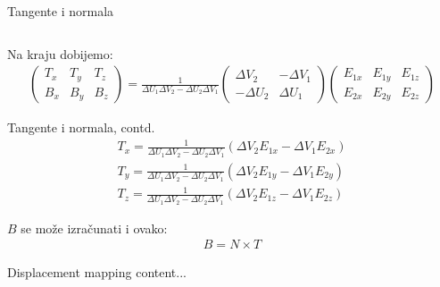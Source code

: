 \documentclass[9pt]{beamer}
\begin{document}
\begin{frame}{Tangente i normala}
\begin{columns}
\begin{column}{0.3\textwidth}
\begin{center}
			\end{center}
		\end{column}
	\end{columns}
	Na kraju dobijemo:
	\begin{align*}
	\begin{pmatrix}
	T_x & T_y &  T_z \\
	B_x & B_y &  B_z
	\end{pmatrix} = 
	\frac{1}{\Delta U_1\Delta V_2 - \Delta U_2\Delta V_1}
	\begin{pmatrix}
	\Delta V_2 & -\Delta V_1 \\
	-\Delta U_2 & \Delta U_1
	\end{pmatrix} 
	\begin{pmatrix}
	E_{1x} & E_{1y} & E_{1z} \\
	E_{2x} & E_{2y} & E_{2z}
	\end{pmatrix}
	\end{align*}
\end{frame}
\begin{frame}{Tangente i normala, contd.}
	\begin{align*}
	T_x = \frac{1}{\Delta U_1\Delta V_2 - \Delta U_2\Delta V_1} (\Delta V_2 E_{1x}-\Delta V_1 E_{2x}) \\
	T_y = \frac{1}{\Delta U_1\Delta V_2 - \Delta U_2\Delta V_1} (\Delta V_2 E_{1y}-\Delta V_1 E_{2y}) \\
	T_z = \frac{1}{\Delta U_1\Delta V_2 - \Delta U_2\Delta V_1} (\Delta V_2 E_{1z}-\Delta V_1 E_{2z})
	\end{align*}
	
	$B$ se može izračunati i ovako:
	\begin{align*}
	B = N \times T
	\end{align*}
\end{frame}
\begin{frame}{Displacement mapping}
	content...
\end{frame}
\end{document}
